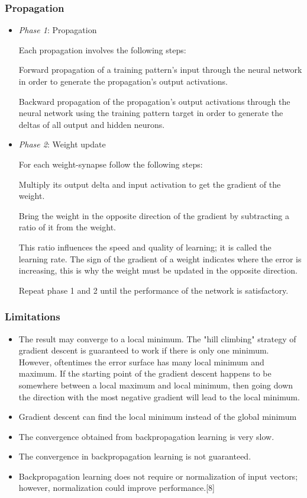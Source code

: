 \documentclass[a4paper,12pt]{article}
\begin{document}
\subsubsection{Propagation}
\begin{itemize}

 \item \emph{Phase 1}: Propagation

Each propagation involves the following steps:

Forward propagation of a training pattern's input through the neural network in order to generate the propagation's output activations.

Backward propagation of the propagation's output activations through the neural network using the training pattern target in order to generate the deltas of all output and hidden neurons.

\item \emph{Phase 2}: Weight update

For each weight-synapse follow the following steps:

Multiply its output delta and input activation to get the gradient of the weight.
    
Bring the weight in the opposite direction of the gradient by subtracting a ratio of it from the weight.

This ratio influences the speed and quality of learning; it is called the learning rate. The sign of the gradient of a weight indicates where the error is increasing, this is why the weight must be updated in the opposite direction.

Repeat phase 1 and 2 until the performance of the network is satisfactory.
\end{itemize}

\subsubsection{Limitations}

\begin{itemize}

 \item The result may converge to a local minimum. The "hill climbing" strategy of gradient descent is guaranteed to work if there is only one minimum. However, oftentimes the error surface has many local minimum and maximum. If the starting point of the gradient descent happens to be somewhere between a local maximum and local minimum, then going down the direction with the most negative gradient will lead to the local minimum.
    \item Gradient descent can find the local minimum instead of the global minimum
    \item The convergence obtained from backpropagation learning is very slow.
    \item The convergence in backpropagation learning is not guaranteed.
    \item Backpropagation learning does not require or normalization of input vectors; however, normalization could improve performance.[8]
\end{itemize}
\end{document}
